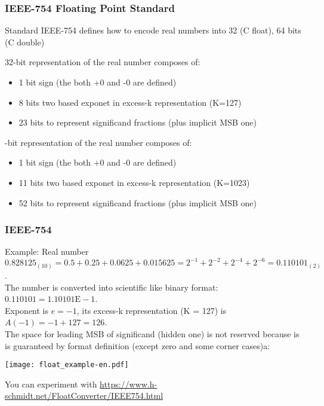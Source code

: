 \documentclass{beamer}
\begin{document}
\begin{frame}
\frametitle{IEEE-754 Floating Point Standard}

Standard IEEE-754 defines how to encode real numbers into 32 (C float), 64 bits (C double)

32-bit representation of the real number composes of:
\begin{itemize}
\item 1 bit sign (the both +0 and -0 are defined)
\item 8 bits two based exponet in excess-k representation (K=127)
\item 23 bits to represent significand fractions (plus implicit MSB one)
\end{itemize}
-bit representation of the real number composes of:
\begin{itemize}
\item 1 bit sign (the both +0 and -0 are defined)
\item 11 bits two based exponet in excess-k representation (K=1023)
\item 52 bits to represent significand fractions (plus implicit MSB one)
\end{itemize}

\end{frame}


\begin{frame}
\frametitle{IEEE-754}

Example:
Real number $0.828125_{(10)} = 0.5+0.25+0.0625+0.015625=2^{-1}+2^{-2}+2^{-4}+2^{-6} = 0.110101_{(2)}$.\\
The number is converted into scientific like binary format: $0.110101 = 1.10101\text{E}-1$.\\
Exponent is $e=-1$, its excess-k representation (K = 127) is $A(-1)=-1+127 = 126$.\\
The space for leading MSB of significand (hidden one) is not reserved because is is guaranteed by format definition (except zero and some corner cases)a:

\begin{center}
\texttt{[image: float\_example-en.pdf]}
\end{center}

You can experiment with \url{https://www.h-schmidt.net/FloatConverter/IEEE754.html}
\end{frame}
\end{document}

